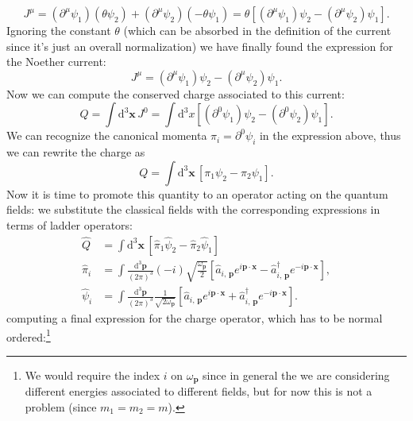 \[
    J^{\mu} = (\partial^{\mu} \psi_1) (\theta \psi_2) + (\partial^{\mu} \psi_2)(-\theta \psi_1) = \theta \left[ (\partial^{\mu} \psi_1) \psi_2 - (\partial^{\mu} \psi_2) \psi_1 \right].
\]
Ignoring the constant \(\theta\) (which can be absorbed in the definition of the current since it's just an overall normalization) we have finally found the expression for the Noether current:
\[
    J^{\mu} = (\partial^{\mu} \psi_1) \psi_2 - (\partial^{\mu} \psi_2) \psi_1.
\]
Now we can compute the conserved charge associated to this current:
\[
    Q = \int \mathrm{d}^3 \mathbf{x} \, J^0 = \int \mathrm{d}^3 x \left[ (\partial^{0} \psi_1) \psi_2 - (\partial^{0} \psi_2) \psi_1 \right].
\]
We can recognize the canonical momenta \(\pi_i = \partial^{0} \psi_i\) in the expression above, thus we can rewrite the charge as
\[
    Q = \int \mathrm{d}^3 \mathbf{x} \, [\pi_1 \psi_2 - \pi_2 \psi_1].
\]
Now it is time to promote this quantity to an operator acting on the quantum fields: we substitute the classical fields with the corresponding expressions in terms of ladder operators:
\[
    \begin{aligned}
        \hat{Q}      & = \int \mathrm{d}^3 \mathbf{x} \, [\hat{\pi}_1 \hat{\psi}_2 - \hat{\pi}_2 \hat{\psi}_1]                                                                                                                                                       \\
        \hat{\pi}_i  & = \int \frac{\mathrm{d}^3 \mathbf{p}}{(2\pi)^3} (-i) \sqrt{\frac{\omega_{\mathbf{p}}}{2}}  \left[ \hat{a}_{i,\,\mathbf{p}} e^{i \mathbf{p} \cdot \mathbf{x}} - \hat{a}^{\dagger}_{i,\,\mathbf{p}} e^{-i \mathbf{p} \cdot \mathbf{x}} \right], \\
        \hat{\psi}_i & = \int \frac{\mathrm{d}^3 \mathbf{p}}{(2\pi)^3} \frac{1}{\sqrt{2\omega_{\mathbf{p}}}} \left[ \hat{a}_{i,\,\mathbf{p}} e^{i \mathbf{p} \cdot \mathbf{x}} + \hat{a}^{\dagger}_{i,\,\mathbf{p}} e^{-i \mathbf{p} \cdot \mathbf{x}} \right].
    \end{aligned}
\]
computing a final expression for the charge operator, which has to be normal ordered:\footnote{We would require the index \(i\) on \(\omega_{\mathbf{p}}\) since in general the we are considering different energies associated to different fields, but for now this is not a problem (since \(m_1 = m_2 = m\)).}
